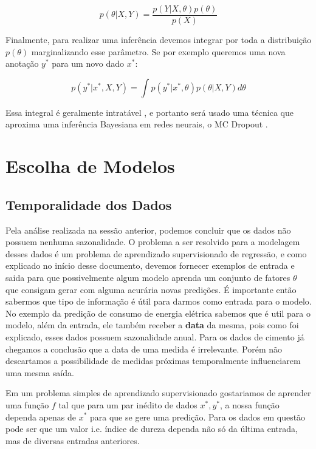 \[    p(\theta | X,Y) = \frac{p(Y| X,\theta) p(\theta)}{p(X)}   \]

Finalmente, para realizar uma inferência devemos integrar por toda a distribuição $p(\theta)$ marginalizando esse parâmetro. Se por exemplo queremos uma nova anotação $y^*$ para um novo dado $x^*$:

\[ p(y^* | x^* , X,Y) = \int  p(y^* | x^*,\theta) p(\theta | X,Y)  d\theta \]

Essa integral é geralmente intratável \citep{bayesml}, e portanto será usado uma técnica que aproxima uma inferência Bayesiana em redes neurais, o MC Dropout \citep{dropbayes}.

\section{Escolha de Modelos}

\subsection{Temporalidade dos Dados}

Pela análise realizada na sessão anterior, podemos concluir que os dados não possuem nenhuma sazonalidade. O problema a ser resolvido para a modelagem desses dados é um problema de aprendizado supervisionado de regressão, e como explicado no início desse documento, devemos fornecer exemplos de entrada e saida para que possivelmente algum modelo aprenda um conjunto de fatores $\theta$ que consigam gerar com alguma acurária novas predições. É importante então sabermos que tipo de informação é útil para darmos como entrada para o modelo. No exemplo da predição de consumo de energia elétrica sabemos que é util para o modelo, além da entrada, ele também receber a \textbf{data} da mesma, pois como foi explicado, esses dados possuem sazonalidade anual. Para os dados de cimento já chegamos a conclusão que a data de uma medida é irrelevante. Porém não descartamos a possibilidade de medidas próximas temporalmente influenciarem uma mesma saída.

Em um problema simples de aprendizado supervisionado gostariamos de aprender uma função $f$ tal que para um par inédito de dados $x^*,y^*$, a nossa função dependa apenas de $x^*$ para que se gere uma predição. Para os dados em questão pode ser que um valor i.e. índice de dureza dependa não só da última entrada, mas de diversas entradas anteriores. 

